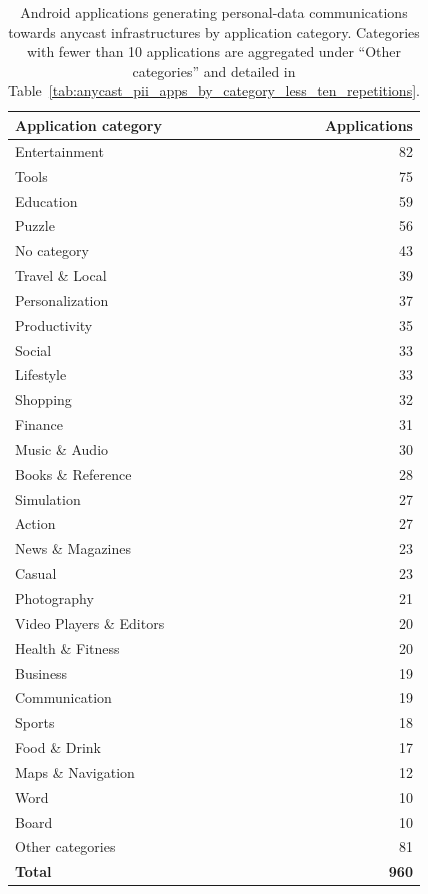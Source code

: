 \begin{table}[ht]
    \centering
    \small
    \caption{Android applications generating personal-data communications towards anycast infrastructures by application category. Categories with fewer than 10 applications are aggregated under ``Other categories'' and detailed in Table~\ref{tab:anycast_pii_apps_by_category_less_ten_repetitions}.}
    \label{tab:anycast_pii_apps_by_category}
    \begin{tabular}{lr}
        \toprule
        \textbf{Application category} & \textbf{Applications} \\
        \midrule
        Entertainment & 82 \\
        Tools & 75 \\
        Education & 59 \\
        Puzzle & 56 \\
        No category & 43 \\
        Travel \& Local & 39 \\
        Personalization & 37 \\
        Productivity & 35 \\
        Social & 33 \\
        Lifestyle & 33 \\
        Shopping & 32 \\
        Finance & 31 \\
        Music \& Audio & 30 \\
        Books \& Reference & 28 \\
        Simulation & 27 \\
        Action & 27 \\
        News \& Magazines & 23 \\
        Casual & 23 \\
        Photography & 21 \\
        Video Players \& Editors & 20 \\
        Health \& Fitness & 20 \\
        Business & 19 \\
        Communication & 19 \\
        Sports & 18 \\
        Food \& Drink & 17 \\
        Maps \& Navigation & 12 \\
        Word & 10 \\
        Board & 10 \\
        Other categories & 81 \\
        \midrule
        \textbf{Total} & \textbf{960} \\
        \bottomrule
    \end{tabular}
\end{table}

